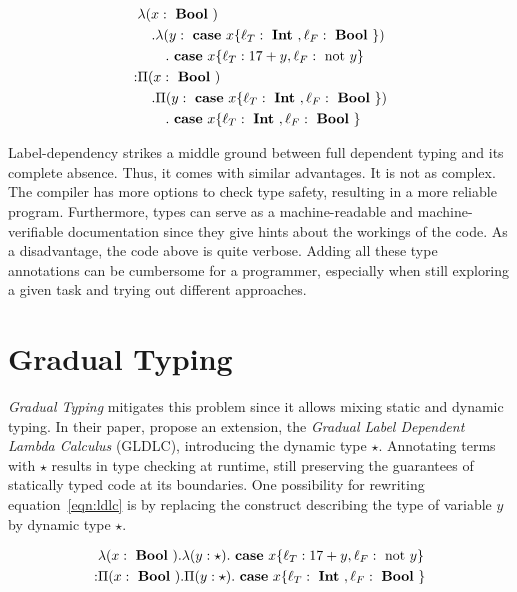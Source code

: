 \begin{equation}\label{eqn:ldlc}
\begin{split}
&\lambda (x: \text{ \textbf{Bool} }) \\
&\quad . \lambda (y: \text{ \textbf{case} } x \{\ell_T: \text{ \textbf{Int} }, \ell_F: \text{ \textbf{Bool} }\} ) \\
&\qquad . \text{ \textbf{case} } x \{\ell_T: 17+y,\ell_F: \text{ not } y\} \\
: & \Pi(x : \text{ \textbf{Bool} }) \\
&\quad . \Pi (y: \text{ \textbf{case} } x \{\ell_T: \text{ \textbf{Int} }, \ell_F: \text{ \textbf{Bool} }\} ) \\
&\qquad . \text{ \textbf{case} } x \{\ell_T: \text{ \textbf{Int} }, \ell_F: \text{ \textbf{Bool} } \}
\end{split}
\end{equation}

Label-dependency strikes a middle ground between full dependent typing and its complete absence. Thus, it comes with similar advantages. It is not as complex. The compiler has more options to check type safety, resulting in a more reliable program. Furthermore, types can serve as a machine-readable and machine-verifiable documentation since they give hints about the workings of the code.
As a disadvantage, the code above is quite verbose. Adding all these type annotations can be cumbersome for a programmer, especially when still exploring a given task and trying out different approaches.

\section{Gradual Typing}

\emph{Gradual Typing} mitigates this problem since it allows mixing static and dynamic typing. In their paper, \cite{fu2021} propose an extension, the \emph{Gradual Label Dependent Lambda Calculus} (GLDLC), introducing the dynamic type $\star$. Annotating terms with $\star$ results in type checking at runtime, still preserving the guarantees of statically typed code at its boundaries. One possibility for rewriting equation~\ref{eqn:ldlc} is by replacing the \case construct describing the type of variable $y$ by dynamic type $\star$.

\begin{equation}\label{eqn:gldlc}
\begin{split}
&\lambda (x: \text{ \textbf{Bool} })
. \lambda (y: \star)
. \text{ \textbf{case} } x \{\ell_T: 17+y,\ell_F: \text{ not } y\} \\
: & \Pi(x : \text{ \textbf{Bool} })
. \Pi (y: \star)
. \text{ \textbf{case} } x \{\ell_T: \text{ \textbf{Int} }, \ell_F: \text{ \textbf{Bool} } \}
\end{split}
\end{equation}

